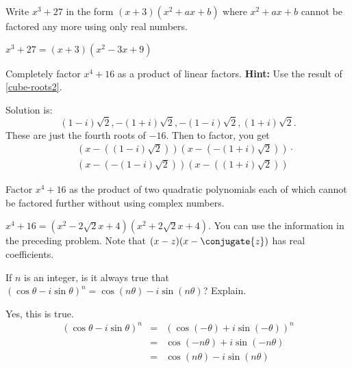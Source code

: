 \begin{ex} Write $x^{3}+27$ in the form $(x+3) (
x^{2}+ax+b) $ where $x^{2}+ax+b$ cannot be factored any more using
only real numbers.
\begin{sol}
$x^{3}+27= (x+3) (
x^{2}-3x+9) $
\end{sol}
\end{ex}

\begin{ex} Completely factor $x^{4}+16$ as a product of linear factors. \textbf{Hint:} Use the result of {\eqref{cube-roots2}}.
\begin{sol}
Solution is:
\[
(1-i) \sqrt{2},-(1+i) \sqrt{2},-(1-i)
\sqrt{2},(1+i) \sqrt{2}.
\]
These are just the fourth roots of $-16$. Then to factor, you get
\begin{eqnarray*}
&&(x-((1-i) \sqrt{2})) (x-(
-(1+i) \sqrt{2})) \cdot \\
&&(x-(-(1-i) \sqrt{2})) (x-(
(1+i) \allowbreak \sqrt{2}))
\end{eqnarray*}
\end{sol}
\end{ex}

\begin{ex} Factor $x^{4}+16$ as the product of two quadratic polynomials each of
which cannot be factored further without using complex numbers.
\begin{sol}
$x^{4}+16=(x^{2}-2\sqrt{2}x+4) (x^{2}+2\sqrt{2}x+4) .
$ You can use the information in the preceding problem. Note that $(
x-z) (x-\conjugate{z}) $ has real coefficients.
\end{sol}
\end{ex}

\begin{ex} If $n$ is an integer, is it always true that $(\cos \theta
-i\sin \theta) ^{n}=\cos (n\theta) -i\sin (n\theta
)$? Explain.
\begin{sol}
Yes, this is true.
\begin{eqnarray*}
(\cos \theta -i\sin \theta) ^{n} &=&(\cos (-\theta
) +i\sin (-\theta)) ^{n} \\
&=&\cos (-n\theta) +i\sin (-n\theta) \\
&=&\cos (n\theta) -i\sin (n\theta)
\end{eqnarray*}
\end{sol}
\end{ex}

